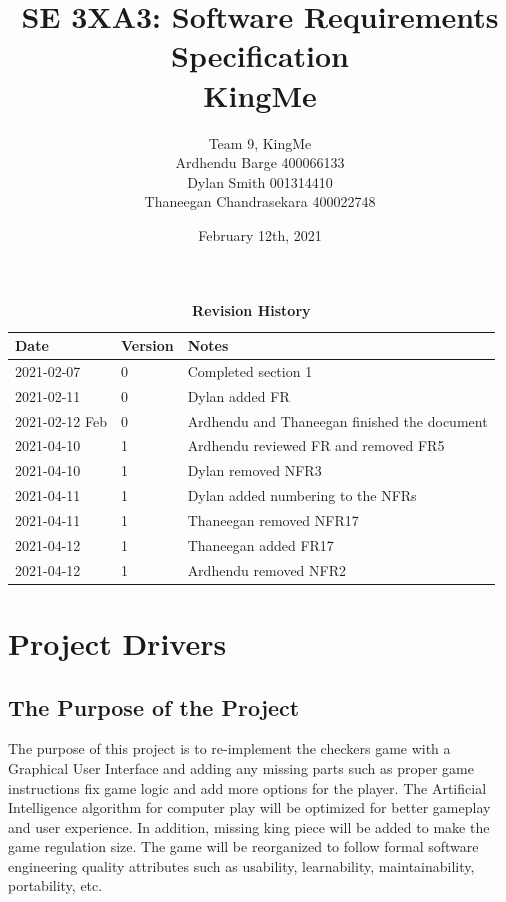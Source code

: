 \documentclass[12pt, titlepage]{article}
\title{SE 3XA3: Software Requirements Specification\\KingMe}
\author{Team 9, KingMe
		\\ Ardhendu Barge 400066133
		\\ Dylan Smith 001314410
		\\ Thaneegan Chandrasekara 400022748
}
\date{February 12th, 2021}
\begin{document}
\maketitle

\tableofcontents
\listoftables
\listoffigures

\begin{table}[H]
\caption{\bf Revision History}
\begin{tabularx}{\textwidth}{p{3cm}p{2cm}X}
\toprule {\bf Date} & {\bf Version} & {\bf Notes}\\
\midrule
2021-02-07 & 0 & Completed section 1\\
2021-02-11 & 0 & Dylan added FR\\
2021-02-12 Feb & 0 & Ardhendu and Thaneegan finished the document\\
2021-04-10 & 1 & Ardhendu reviewed FR and removed FR5\\
2021-04-10 & 1 & Dylan removed NFR3\\
2021-04-11 & 1 & Dylan added numbering to the NFRs\\
2021-04-11 & 1 & Thaneegan removed NFR17\\
2021-04-12 & 1 & Thaneegan added FR17\\
2021-04-12 & 1 & Ardhendu removed NFR2\\

\bottomrule
\end{tabularx}
\end{table}

\newpage



\section{Project Drivers}

\subsection{The Purpose of the Project}
The purpose of this project is to re-implement the checkers game with a Graphical User Interface and adding any missing parts such as proper game instructions {\color{blue} fix game logic and add more options for the player}. The Artificial Intelligence algorithm for computer play will be optimized for better gameplay and user experience. In addition, missing  {\color{blue} king piece} will be added to make the game regulation size. The game will be reorganized to follow formal software engineering quality attributes such as {\color{blue} usability, learnability, maintainability, portability, etc}.  
\end{document}

